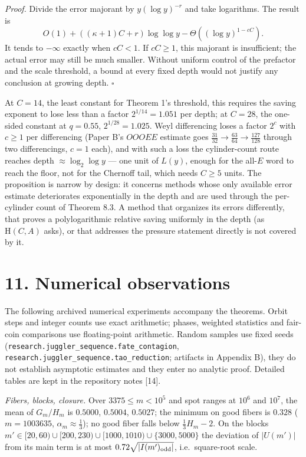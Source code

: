 \documentclass[11pt,a4paper]{article}
\begin{document}
\emph{Proof.} Divide the error majorant by \(y(\log y)^{-r}\) and take
logarithms. The result is \[
O(1)+((\kappa+1)C+r)\log\log y
 -\Theta((\log y)^{1-cC}).
\] It tends to \(-\infty\) exactly when \(cC<1\). If \(cC\ge1\), this
majorant is insufficient; the actual error may still be much smaller.
Without uniform control of the prefactor and the scale threshold, a
bound at every fixed depth would not justify any conclusion at growing
depth. \(\square\)

At \(C=14\), the least constant for Theorem 1's threshold, this requires
the saving exponent to lose less than a factor \(2^{1/14}=1.051\) per
depth; at \(C=28\), the one-sided constant at \(q=0.55\),
\(2^{1/28}=1.025\). Weyl differencing loses a factor \(2^{c}\) with
\(c\ge1\) per differencing (Paper B's \(OOOEE\) estimate goes
\(\tfrac{31}{32}\to\tfrac{63}{64}\to\tfrac{127}{128}\) through two
differencings, \(c=1\) each), and with such a loss the cylinder-count
route reaches depth \(\approx\log_2\log y\) --- one unit of \(L(y)\),
enough for the all-\(E\) word to reach the floor, not for the Chernoff
tail, which needs \(C\ge 5\) units. The proposition is narrow by design:
it concerns methods whose only available error estimate deteriorates
exponentially in the depth and are used through the per-cylinder count
of Theorem 8.3. A method that organizes its errors differently, that
proves a polylogarithmic relative saving uniformly in the depth (as
\(\mathrm H(C,A)\) asks), or that addresses the pressure statement
directly is not covered by it.

\section{11. Numerical observations}\label{numerical-observations}

The following archived numerical experiments accompany the theorems.
Orbit steps and integer counts use exact arithmetic; phases, weighted
statistics and fair-coin comparisons use floating-point arithmetic.
Random samples use fixed seeds
(\texttt{\nolinkurl{research.juggler_sequence.fate_contagion}},
\texttt{\nolinkurl{research.juggler_sequence.tao_reduction}}; artifacts
in Appendix B), they do not establish asymptotic estimates and they
enter no analytic proof. Detailed tables are kept in the repository
notes {[}14{]}.

\emph{Fibers, blocks, closure.} Over \(3375\le m<10^5\) and spot ranges
at \(10^6\) and \(10^7\), the mean of \(G_m/H_m\) is \(0.5000\),
\(0.5004\), \(0.5027\); the minimum on good fibers is \(0.328\)
(\(m=1003635\), \(\alpha_m\approx\tfrac13\)); no good fiber falls below
\(\tfrac13H_m-2\). On the blocks
\(m'\in[20,60)\cup[200,230)\cup[1000,1010)\cup\{3000,5000\}\) the
deviation of \(|U(m')|\) from its main term is at most
\(0.72\sqrt{|I(m')_{\rm odd}|}\), i.e.~square-root scale.
\end{document}
